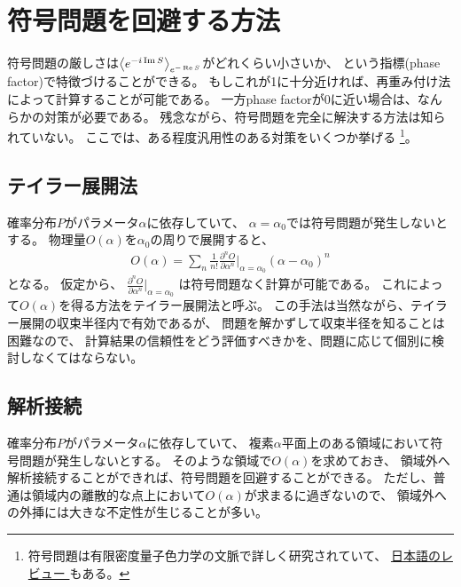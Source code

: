 \documentclass[]{ltjsarticle}
\newcommand{\del}{\partial}
\begin{document}
\section{符号問題を回避する方法}
符号問題の厳しさは$\expval{e^{-i\Im S}}_{e^{-\Re S}}$がどれくらい小さいか、
という指標(phase factor)で特徴づけることができる。
もしこれが1に十分近ければ、再重み付け法によって計算することが可能である。
一方phase factorが0に近い場合は、なんらかの対策が必要である。
残念ながら、符号問題を完全に解決する方法は知られていない。
ここでは、ある程度汎用性のある対策をいくつか挙げる
\footnote{
    符号問題は有限密度量子色力学の文脈で詳しく研究されていて、
    \href{http://www2.yukawa.kyoto-u.ac.jp/~soken.editorial/sokendenshi/vol31/Nagata2016GKH_EI.pdf}{
        日本語のレビュー
    }
    もある。
}。


\subsection{テイラー展開法}
確率分布$P$がパラメータ$\alpha$に依存していて、
$\alpha = \alpha_0$では符号問題が発生しないとする。
物理量$O(\alpha)$を$\alpha_0$の周りで展開すると、
\begin{align}
    O(\alpha)
    =
    \sum_{n} \frac{1}{n!} \frac{\del^n O}{\del \alpha^n}\Big|_{\alpha=\alpha_0} 
    (\alpha - \alpha_0)^n
\end{align}
となる。
仮定から、
$\frac{\del^n O}{\del \alpha^n}\Big|_{\alpha=\alpha_0}$
は符号問題なく計算が可能である。
これによって$O(\alpha)$を得る方法をテイラー展開法と呼ぶ。
この手法は当然ながら、テイラー展開の収束半径内で有効であるが、
問題を解かずして収束半径を知ることは困難なので、
計算結果の信頼性をどう評価すべきかを、問題に応じて個別に検討しなくてはならない。



\subsection{解析接続}
確率分布$P$がパラメータ$\alpha$に依存していて、
複素$\alpha$平面上のある領域において符号問題が発生しないとする。
そのような領域で$O(\alpha)$を求めておき、
領域外へ解析接続することができれば、符号問題を回避することができる。
ただし、普通は領域内の離散的な点上において$O(\alpha)$が求まるに過ぎないので、
領域外への外挿には大きな不定性が生じることが多い。
\end{document}
